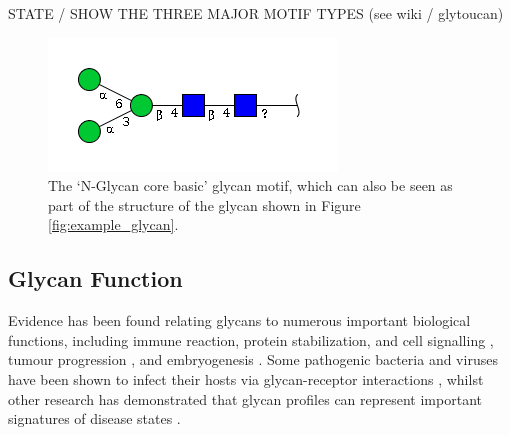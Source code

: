 \documentclass[12pt,a4paper]{article}
\begin{document}
STATE / SHOW THE THREE MAJOR MOTIF TYPES (see wiki / glytoucan)

\begin{figure}[H]
\centering 
\includegraphics[scale=0.8]{images/n-glycan_core_basic.png} 
\caption{The `N-Glycan core basic' glycan motif, which can also be seen as part of the structure of the glycan shown in Figure \ref{fig:example_glycan}.}
\label{fig:N-Glycan core basic}
\end{figure}









\subsection{Glycan Function}
\label{sec:glycan_function}
Evidence has been found relating glycans to numerous important biological functions, including immune reaction, protein stabilization, and cell signalling \citep{bucior2004carbohydrate}, tumour progression \citep{fuster2005sweet}, and embryogenesis \citep{rosa2002functional}. Some pathogenic bacteria and viruses have been shown to infect their hosts via glycan-receptor interactions \citep{cossart2004bacterial, sacks2001molecular}, whilst other research has demonstrated that glycan profiles can represent important signatures of disease states \citep{tong2003glycosylation}.


\end{document}
